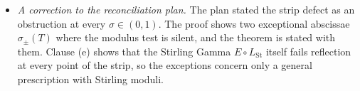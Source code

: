 \documentclass[11pt,a4paper]{article}
\numberwithin{equation}{section}
\theoremstyle{definition}
\theoremstyle{remark}
\newcommand{\LSt}{L_{\mathrm{St}}}
\newcommand{\merge}{\textup{[merge]}}
\begin{document}
\begin{itemize}
 \cref{gz:sec:nonunique}(2), and \cref{gz:thm:stability} as one theorem.
 After the post-merge audit: clause (e) of \cref{gz:thm:strip} and the
 constant-term step in the proof of \cref{gz:thm:stirling}. Further
 \merge{} steps complete proofs inside \cref{gz:lem:Vunique},
 \cref{gz:lem:primeindependence} and \cref{gz:q:nonresonant}.
\item \emph{A correction to the reconciliation plan.} The plan stated the
 strip defect as an obstruction at every $\sigma\in(0,1)$. The proof shows
 two exceptional abscissae $\sigma_\pm(T)$ where the modulus test is silent,
 and the theorem is stated with them. Clause (e) shows that the Stirling
 Gamma $E\circ\LSt$ itself fails reflection at every point of the strip,
 so the exceptions concern only a general prescription with Stirling moduli.
\end{itemize}
\end{document}
